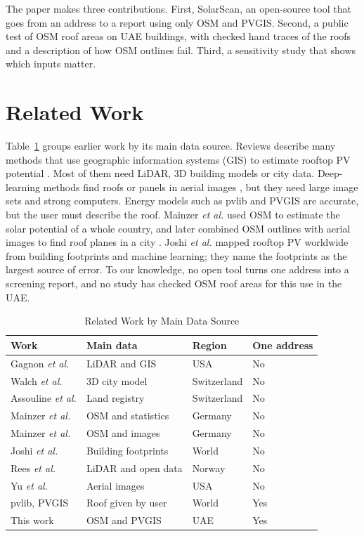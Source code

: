\documentclass[conference]{IEEEtran}
\begin{document}
The paper makes three contributions. First, SolarScan, an open-source tool that goes from an address to a report using only OSM and PVGIS. Second, a public test of OSM roof areas on \NBuildings{} UAE buildings, with checked hand traces of the roofs and a description of how OSM outlines fail. Third, a sensitivity study that shows which inputs matter.

\section{Related Work}

Table~\ref{tab:prior} groups earlier work by its main data source. Reviews describe many methods that use geographic information systems (GIS) to estimate rooftop PV potential \cite{freitas2015, gassar2021}. Most of them need LiDAR, 3D building models or city data. Deep-learning methods find roofs or panels in aerial images \cite{yu2018}, but they need large image sets and strong computers. Energy models such as pvlib \cite{holmgren2018} and PVGIS \cite{huld2012} are accurate, but the user must describe the roof. Mainzer \emph{et al.} \cite{mainzer2014} used OSM to estimate the solar potential of a whole country, and later combined OSM outlines with aerial images to find roof planes in a city \cite{mainzer2017}. Joshi \emph{et al.} \cite{joshi2021} mapped rooftop PV worldwide from building footprints and machine learning; they name the footprints as the largest source of error. To our knowledge, no open tool turns one address into a screening report, and no study has checked OSM roof areas for this use in the UAE.

\begin{table}[t]
\centering
\caption{Related Work by Main Data Source}
\label{tab:prior}
\footnotesize
\setlength{\tabcolsep}{2.5pt}
\begin{tabular}{llll}
\toprule
Work & Main data & Region & One address \\
\midrule
Gagnon \emph{et al.} \cite{gagnon2016, gagnon2018} & LiDAR and GIS & USA & No \\
Walch \emph{et al.} \cite{walch2020} & 3D city model & Switzerland & No \\
Assouline \emph{et al.} \cite{assouline2018} & Land registry & Switzerland & No \\
Mainzer \emph{et al.} \cite{mainzer2014} & OSM and statistics & Germany & No \\
Mainzer \emph{et al.} \cite{mainzer2017} & OSM and images & Germany & No \\
Joshi \emph{et al.} \cite{joshi2021} & Building footprints & World & No \\
Rees \emph{et al.} \cite{rees2025} & LiDAR and open data & Norway & No \\
Yu \emph{et al.} \cite{yu2018} & Aerial images & USA & No \\
pvlib, PVGIS \cite{holmgren2018, huld2012} & Roof given by user & World & Yes \\
This work & OSM and PVGIS & UAE & Yes \\
\bottomrule
\end{tabular}
\end{table}
\end{document}

